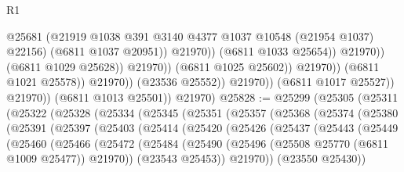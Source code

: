 \begin{lexlean}{R1}
\begin{coremodule}
                                                  @25681
                                                  (@21919
                                                    @1038
                                                    @391
                                                    @3140
                                                    @4377
                                                    @1037
                                                    @10548
                                                    (@21954 @1037)
                                                    @22156)
                                                  (@6811 @1037 @20951))
                                                @21970))
                                            (@6811 @1033 @25654))
                                          @21970))
                                      (@6811 @1029 @25628))
                                    @21970))
                                (@6811 @1025 @25602))
                              @21970))
                          (@6811 @1021 @25578))
                        @21970))
                    (@23536 @25552))
                  @21970))
              (@6811 @1017 @25527))
            @21970))
        (@6811 @1013 @25501))
      @21970)
@25828 := @25299
    (@25305
      (@25311
        (@25322
          (@25328
            (@25334
              (@25345
                (@25351
                  (@25357
                    (@25368
                      (@25374
                        (@25380
                          (@25391
                            (@25397
                              (@25403
                                (@25414
                                  (@25420
                                    (@25426
                                      (@25437
                                        (@25443
                                          (@25449
                                            (@25460
                                              (@25466
                                                (@25472
                                                  (@25484
                                                    (@25490
                                                      (@25496
                                                        (@25508 @25770 (@6811 @1009 @25477))
                                                        @21970))
                                                    (@23543 @25453))
                                                  @21970))
                                              (@23550 @25430))

\end{coremodule}
\end{lexlean}
